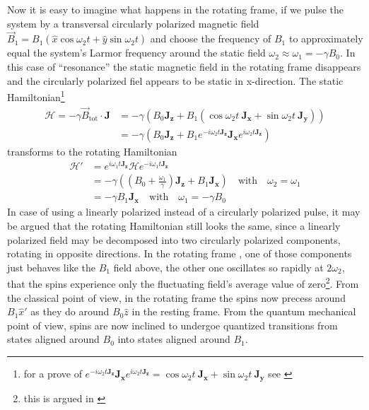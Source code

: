 \documentclass[11.5pt,a4paper]{article}
\begin{document}
Now it is easy to imagine what happens in the rotating frame, if we pulse the system by a transversal circularly polarized magnetic field $\vec{B}_1 = B_1 (\hat{x} \cos \omega_2 t + \hat{y} \sin \omega_2 t)$ and choose the frequency of $B_1$ to approximately equal the system's Larmor frequency around the static field $\omega_2 \approx \omega_1 = - \gamma B_0$. In this case of ``resonance'' the static magnetic field in the rotating frame disappears and the circularly polarized fiel appears to be static in x-direction. The static Hamiltonian\footnote{ for a prove of $e^{-i \omega_2 t \mathbf{J_z}} \mathbf{J_x} e^{i \omega_2 t \mathbf{J_z}} = \cos \omega_2 t \ \mathbf{J_x} + \sin \omega_2 t \ \mathbf{J_y}$ see \cite[chap 2.6 Exponential Operators, p. 27f]{slichter}}
\begin{align}
 \mathcal{H} = -\gamma \vec{B}_\text{tot} \cdot \mathbf{J}  & = - \gamma \left( B_0 \mathbf{J_z} + B_1 ( \cos \omega_2 t \ \mathbf{J_x} + \sin \omega_2 t \ \mathbf{J_y} ) \right) \\
  & = - \gamma \left( B_0 \mathbf{J_z} + B_1 e^{-i \omega_2 t \mathbf{J_z}} \mathbf{J_x} e^{i \omega_2 t \mathbf{J_z}} \right)
\end{align}
transforms to the rotating Hamiltonian
\begin{align}
\mathcal{H'} & = e^{i \omega_1 t \mathbf{J_z}} \mathcal{H} e^{-i \omega_1 t \mathbf{J_z}} \\
& = -\gamma \left( (B_0 + \frac{\omega_1}{\gamma}) \mathbf{J_z} + B_1 \mathbf{J_x} \right)  \quad \text{with} \quad \omega_2 = \omega_1\\
  & = - \gamma B_1 \mathbf{J_x} \quad \text{with} \quad \omega_1 = - \gamma B_0 
\end{align}
In case of using a linearly polarized instead of a circularly polarized pulse, it may be argued that the rotating Hamiltonian still looks the same, since a linearly polarized field may be decomposed into two circularly polarized components, rotating in opposite directions. In the rotating frame , one of those components just behaves like the $B_1$ field above, the other one oscillates so rapidly at $2\omega_2$, that the spins experience only the fluctuating field's average value of zero\footnote{this is argued in \cite[chap. 4.2.2 The resonant frequency field, p.111f]{nmr-ox}}. From the classical point of view, in the rotating frame the spins now precess around $B_1 \hat{x}'$ as they do around $B_0 \hat{z}$ in the resting frame. From the quantum mechanical point of view, spins are now inclined to undergoe quantized transitions from states aligned around $B_0$ into states aligned around $B_1$.
\end{document}
